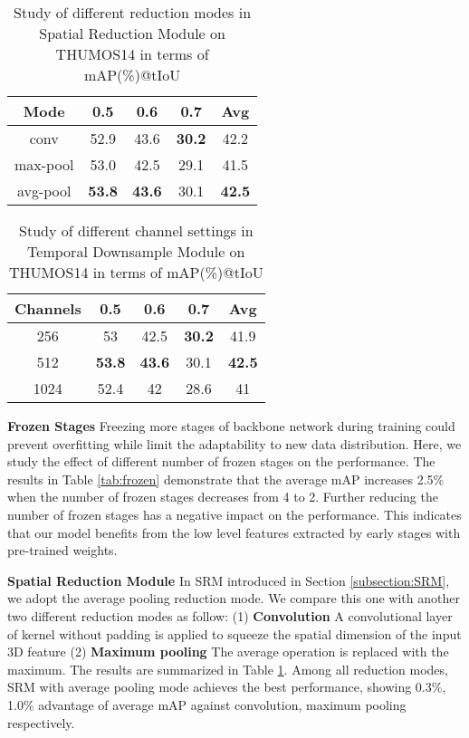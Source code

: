 \documentclass[final]{cvpr}
\begin{document}
\begin{table}[htbp]
    \caption{Study of different reduction modes in Spatial Reduction Module on THUMOS14 in terms of mAP(\%)@tIoU}
    \centering
    \begin{tabular}{ c | c c c c }
        \toprule
        Mode & 0.5 & 0.6 & 0.7 & Avg \\
        \midrule
        conv & 52.9 & 43.6 & \textbf{30.2} & 42.2 \\
        max-pool & 53.0 & 42.5 & 29.1 & 41.5\\
        avg-pool & \textbf{53.8} & \textbf{43.6} & 30.1 & \textbf{42.5} \\
        \bottomrule
    \end{tabular}
    \label{tab:SRM}
\end{table}

\begin{table}[htbp]
    \caption{Study of different channel settings in Temporal Downsample Module on THUMOS14 in terms of mAP(\%)@tIoU}
    \centering
    \begin{tabular}{ c | c c c c }
        \toprule
        Channels & 0.5 & 0.6 & 0.7 & Avg \\
        \midrule
        256 & 53 & 42.5 & \textbf{30.2} & 41.9 \\
        512 & \textbf{53.8} & \textbf{43.6} & 30.1 & \textbf{42.5} \\
        1024 & 52.4 & 42 & 28.6 & 41 \\
        \bottomrule
    \end{tabular}
    \label{tab:channel}
\end{table}

\textbf{Frozen Stages}
Freezing more stages of backbone network during training could prevent overfitting while limit the adaptability to new data distribution. Here, we study the effect of different number of frozen stages on the performance. The results in Table \ref{tab:frozen} demonstrate that the average mAP increases 2.5\% when the number of frozen stages decreases from 4 to 2. Further reducing the number of frozen stages has a negative impact on the performance. This indicates that our model benefits from the low level features extracted by early stages with pre-trained weights.

\textbf{Spatial Reduction Module}
In SRM introduced in Section \ref{subsection:SRM}, we adopt the average pooling reduction mode. We compare this one with another two different reduction modes as follow: (1) \textbf{Convolution} A convolutional layer of  kernel without padding is applied to squeeze the spatial dimension of the input 3D feature (2) \textbf{Maximum pooling} The average operation is replaced with the maximum. The results are summarized in Table \ref{tab:SRM}. Among all reduction modes, SRM with average pooling mode achieves the best performance, showing 0.3\%, 1.0\% advantage of average mAP against convolution, maximum pooling respectively.
\end{document}
